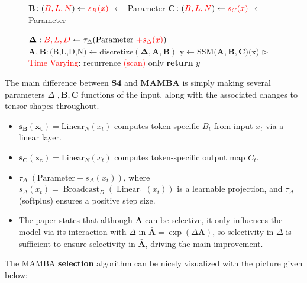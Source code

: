 \documentclass{article}
\theoremstyle{definition}
\begin{document}
{\begin{figure}[ht!]
\begin{minipage}[t]{0.48\textwidth}
\begin{algorithm}[H]
\begin{algorithmic}[1]
      \State \textbf{B}$ \colon (\textcolor{red}{B,L,N}) \leftarrow \textcolor{red}{s_B(x)} $ \hfill \(\leftarrow\) Parameter
      \State \textbf{C}$ \colon (\textcolor{red}{B,L,N}) \leftarrow \textcolor{red}{s_C(x)} $ \hfill \(\leftarrow\) Parameter
      
      \State $\bm{\Delta}: \textcolor{red}{B,L,D} \leftarrow \tau_{\Delta}  \text{(Parameter  \(\textcolor{red}{+ s_{\Delta}(x)}\))}$
      \State $\bar{\bm{A}} , \bar{\bm{B}}: \text{(B,L,D,N)} \leftarrow \text{discretize}(\bm{\Delta , A,B})$
      \State $\text{y} \leftarrow \text{SSM($\bar{\bm{A}} , \bar{\bm{B}} ,{\bm{C}}$)(x)}$
      \State  \hfill \(\triangleright\) \textcolor{red}{Time Varying}: recurrence \textcolor{red}{(scan)} only
      \State \textbf{return} $y$
    
    \end{algorithmic}
    \end{algorithm}
    \end{minipage}
    
    \end{figure}
}
\vspace{+2mm}
The main difference between \textbf{S4} and \textbf{MAMBA} is simply making several parameters $\Delta$  $\bm{ , B,C}$ functions of the input, along with the associated changes to tensor shapes throughout.
\begin{itemize}
   \item $\bm{s_B(x_t)} = \text{Linear}_N(x_t)$ computes token-specific $B_t$ from input $x_t$ via a linear layer.

    \item $\bm{s_C(x_t)} = \text{Linear}_N(x_t)$ computes token-specific output map $C_t$.

   \item $\tau_{\Delta} \; (\text{Parameter} + s_{\Delta}(x_t))$, where $s_{\Delta}(x_t) = \operatorname{Broadcast}_D(\operatorname{Linear}_1(x_t))$ is a learnable projection, and $\tau_{\Delta}$ (softplus) ensures a positive step size.


    \item The paper states that although \textbf{A} can be selective, it only influences the model via its interaction with $\Delta$ in $\bar{\textbf{A}} = \exp(\Delta \textbf{A})$, so selectivity in $\Delta$ is sufficient to ensure selectivity in $\bar{\textbf{A}}$, driving the main improvement.

\end{itemize}
The MAMBA \textbf{selection} algorithm can be nicely visualized with the picture given below:
\end{document}
